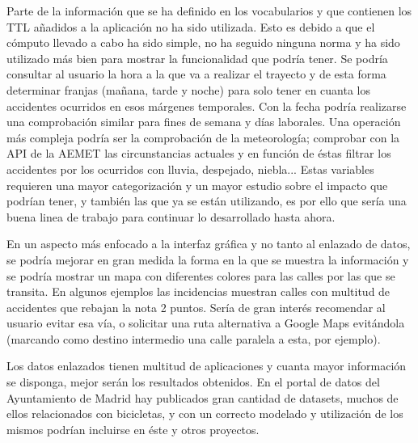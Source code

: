 Parte de la información que se ha definido en los vocabularios y que contienen los TTL añadidos a la aplicación no ha sido utilizada. Esto es debido a que el cómputo llevado a cabo ha sido simple, no ha seguido ninguna norma y ha sido utilizado más bien para mostrar la funcionalidad que podría tener. Se podría consultar al usuario la hora a la que va a realizar el trayecto y de esta forma determinar franjas (mañana, tarde y noche) para solo tener en cuanta los accidentes ocurridos en esos márgenes temporales. Con la fecha podría realizarse una comprobación similar para fines de semana y días laborales. Una operación más compleja podría ser la comprobación de la meteorología; comprobar con la API de la AEMET las circunstancias actuales y en función de éstas filtrar los accidentes por los ocurridos con lluvia, despejado, niebla... Estas variables requieren una mayor categorización y un mayor estudio sobre el impacto que podrían tener, y también las que ya se están utilizando, es por ello que sería una buena linea de trabajo para continuar lo desarrollado hasta ahora.

En un aspecto más enfocado a la interfaz gráfica y no tanto al enlazado de datos, se podría mejorar en gran medida la forma en la que se muestra la información y se podría mostrar un mapa con diferentes colores para las calles por las que se transita. En algunos ejemplos las incidencias muestran calles con multitud de accidentes que rebajan la nota 2 puntos. Sería de gran interés recomendar al usuario evitar esa vía, o solicitar una ruta alternativa a Google Maps evitándola (marcando como destino intermedio una calle paralela a esta, por ejemplo).


Los datos enlazados tienen multitud de aplicaciones y cuanta mayor información se disponga, mejor serán los resultados obtenidos. En el portal de datos del Ayuntamiento de Madrid \cite{datosabiertos_ayuntmadrid} hay publicados gran cantidad de datasets, muchos de ellos relacionados con bicicletas, y con un correcto modelado y utilización de los mismos podrían incluirse en éste y otros proyectos.
